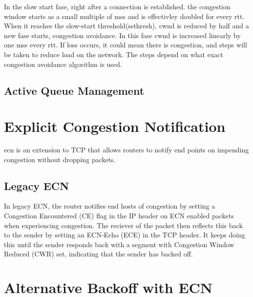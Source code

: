 In the slow start fase,  right after a connection is established. the congestion window starts as a small multiple of \gls{mss} and is effectivley doubled for every \gls{rtt}. When it reaches the slow-start threshold(ssthresh), \gls{cwnd} is reduced by half and a new fase starts, congestion avoidance. In this fase \gls{cwnd} is increased linearly by one \gls{mss} every \gls{rtt}. If loss occurs, it could mean there is congestion, and steps will be taken to reduce load on the network. The steps depend on what exact congestion avoidance algorithm is used.

\subsection{Active Queue Management}

\section{Explicit Congestion Notification}

\gls{ecn} is an extension to TCP that allows routers to notify end points on impending congestion without dropping packets.

\subsection{Legacy ECN}
In legacy ECN, the router notifies end hosts of congestion by setting a Congestion Encountered (CE) flag in the IP header on ECN enabled packets when experiencing congestion. The reciever of the packet then reflects this back to the sender by setting an ECN-Echo (ECE) in the TCP header. It keeps doing this until the sender responds back with a segment with Congestion Window Reduced (CWR) set, indicating that the sender has backed off.


\section{Alternative Backoff with ECN}

